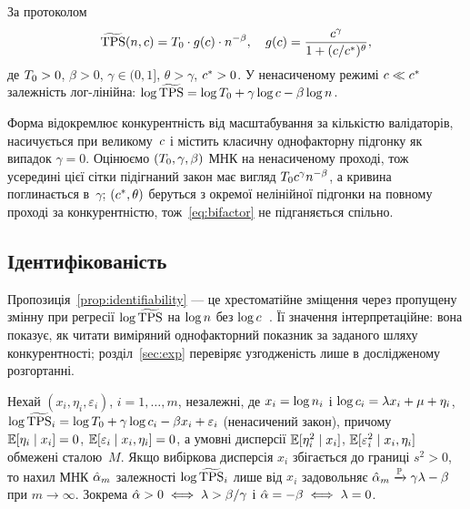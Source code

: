 \begin{Def}
\label{def:bifactor}
За протоколом \RNM{}
\begin{equation}
\TPSn(\n,\cc)=\Tzero\cdot\gfun(\cc)\cdot\n^{-\beta},
\quad
\gfun(\cc)=\frac{\cc^{\gamma}}{1+(\cc/\csat)^{\theta}},
\label{eq:bifactor}
\end{equation}
де $T_{0}>0$, $\beta>0$, $\gamma\in(0,1]$, $\theta>\gamma$, $c^{\ast}>0$.
У ненасиченому режимі $c\ll c^{\ast}$ залежність лог-лінійна:
$\log\widetilde{\mathrm{TPS}}=\log T_{0}+\gamma\log c-\beta\log n$.
\end{Def}

Форма відокремлює конкурентність від масштабування за кількістю валідаторів,
насичується при великому~$c$ і містить класичну однофакторну підгонку як
випадок $\gamma=0$. Оцінюємо $(T_{0},\gamma,\beta)$ МНК на ненасиченому проході,
тож усередині цієї сітки підігнаний закон має вигляд
$T_{0}c^{\gamma}n^{-\beta}$, а кривина поглинається в~$\gamma$;
$(c^{\ast},\theta)$ беруться з окремої нелінійної підгонки на повному проході за
конкурентністю, тож~\eqref{eq:bifactor} не підганяється спільно.

\subsection{Ідентифікованість}

Пропозиція~\ref{prop:identifiability} --- це хрестоматійне зміщення через
пропущену змінну при регресії $\log\widetilde{\mathrm{TPS}}$ на $\log n$ без
$\log c$~\cite{wooldridge2010}. Її значення інтерпретаційне: вона показує, як
читати виміряний однофакторний показник за заданого шляху конкурентності;
розділ~\ref{sec:exp} перевіряє узгодженість лише в дослідженому розгортанні.

\begin{Proposition}
\label{prop:identifiability}
Нехай $(x_{i},\eta_{i},\varepsilon_{i})$, $i=1,\dots,m$, незалежні, де
$x_{i}=\log n_{i}$ і
$\log c_{i}=\lambda x_{i}+\mu+\eta_{i}$,
$\log\widetilde{\mathrm{TPS}}_{i}=\log T_{0}+\gamma\log c_{i}-\beta x_{i}+\varepsilon_{i}$
(ненасичений закон), причому $\mathbb{E}[\eta_{i}\mid x_{i}]=0$,
$\mathbb{E}[\varepsilon_{i}\mid x_{i},\eta_{i}]=0$, а умовні дисперсії
$\mathbb{E}[\eta_{i}^{2}\mid x_{i}]$, $\mathbb{E}[\varepsilon_{i}^{2}\mid x_{i},\eta_{i}]$ обмежені
сталою~$M$. Якщо вибіркова дисперсія $x_{i}$
збігається до границі $s^{2}>0$, то нахил МНК $\hat{\alpha}_{m}$ залежності
$\log\widetilde{\mathrm{TPS}}_{i}$ лише від $x_{i}$ задовольняє
$\hat{\alpha}_{m}\xrightarrow{\mathbb{P}}\gamma\lambda-\beta$ при $m\to\infty$.
Зокрема $\hat{\alpha}>0\iff\lambda>\beta/\gamma$ і $\hat{\alpha}=-\beta\iff\lambda=0$.
\end{Proposition}

